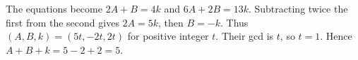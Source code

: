 The equations become $2A+B=4k$ and $6A+2B=13k$. Subtracting twice the first from the second gives $2A=5k$, then $B=-k$. Thus $(A,B,k)=(5t,-2t,2t)$ for positive integer $t$. Their gcd is $t$, so $t=1$. Hence $A+B+k=5-2+2=\boxed5$.
